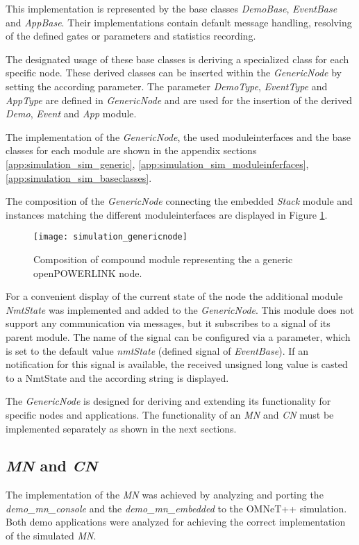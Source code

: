 This implementation is represented by the base classes \emph{DemoBase}, \emph{EventBase} and \emph{AppBase}.
Their implementations contain default message handling, resolving of the defined gates or parameters and statistics recording.

The designated usage of these base classes is deriving a specialized class for each specific node.
These derived classes can be inserted within the \emph{GenericNode} by setting the according parameter.
The parameter \emph{DemoType}, \emph{EventType} and \emph{AppType} are defined in \emph{GenericNode} and are used for the insertion of the derived \emph{Demo}, \emph{Event} and \emph{App} module.

The implementation of the \emph{GenericNode}, the used moduleinterfaces and the base classes for each module are shown in the appendix sections \ref{app:simulation_sim_generic}, \ref{app:simulation_sim_moduleinferfaces}, \ref{app:simulation_sim_baseclasses}.

The composition of the \emph{GenericNode} connecting the embedded \emph{Stack} module and instances matching the different moduleinterfaces are displayed in Figure \ref{fig:simulation_genericnode}.

\begin{figure}
    \centering
    \texttt{[image: simulation\_genericnode]}
    \caption{Composition of compound module representing the a generic openPOWERLINK node.}
    \label{fig:simulation_genericnode}
\end{figure}

For a convenient display of the current state of the node the additional module \emph{NmtState} was implemented and added to the \emph{GenericNode}.
This module does not support any communication via messages, but it subscribes to a signal of its parent module.
The name of the signal can be configured via a parameter, which is set to the default value \emph{nmtState} (defined signal of \emph{EventBase}).
If an notification for this signal is available, the received unsigned long value is casted to a NmtState and the according string is displayed.

The \emph{GenericNode} is designed for deriving and extending its functionality for specific nodes and applications.
The functionality of an \emph{MN} and \emph{CN} must be implemented separately as shown in the next sections.

\subsection{\emph{MN} and \emph{CN}}
\label{sec:porting_nodes_mn_cm}
The implementation of the \emph{MN} was achieved by analyzing and porting the \emph{demo\_mn\_console} and the \emph{demo\_mn\_embedded} to the OMNeT++ simulation.
Both demo applications were analyzed for achieving the correct implementation of the simulated \emph{MN}.

